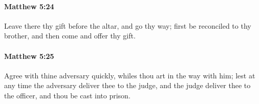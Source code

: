 		\paragraph{Matthew 5:24} %
			\label{MATTHEW-5-24}

			Leave there thy gift before the altar, and go thy way; first be reconciled to thy brother, and then come and offer thy gift.

			\begin{framed}
			\scriptsize
				\begin{compactdesc}
					\item[SBLG] 
				\end{compactdesc}
			\end{framed}

		\paragraph{Matthew 5:25} %
			\label{MATTHEW-5-25}

			Agree with thine adversary quickly, whiles thou art in the way with him; lest at any time the adversary deliver thee to the judge, and the judge deliver thee to the officer, and thou be cast into prison.

